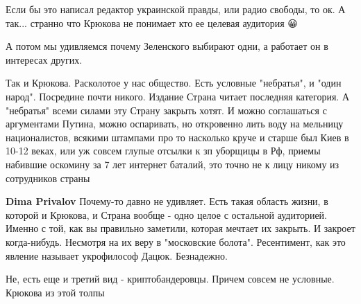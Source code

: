 \begin{itemize}
 
Если бы это написал редактор украинской правды, или радио свободы, то ок. А
так... странно что Крюкова не понимает кто ее целевая аудитория 😀

А потом мы удивляемся почему Зеленского выбирают одни, а работает он в
интересах других.

Так и Крюкова. Расколотое у нас общество. Есть условные "небратья", и "один
народ". Посредине почти никого. Издание Страна читает последняя категория. А
"небратья" всеми силами эту Страну закрыть хотят. И можно соглашаться с
аргументами Путина, можно оспаривать, но откровенно лить воду на мельницу
националистов, всякими штампами про то насколько круче и старше был Киев в
10-12 веках, или уж совсем глупые отсылки к зп уборщицы в Рф, приемы набившие
оскомину за 7 лет интернет баталий, это точно не к лицу никому из сотрудников
страны

\begin{itemize}
 
\textbf{Dima Privalov} Почему-то давно не удивляет. Есть такая область жизни, в которой и Крюкова, и Страна вообще - одно целое с остальной аудиторией. Именно с той, как вы правильно заметили, которая мечтает их закрыть. И закроет когда-нибудь. Несмотря на их веру в "московские болота". Ресентимент, как это явление называет укрофилософ Дацюк. Безнадежно.

 
Не, есть еще и третий вид - криптобандеровцы. Причем совсем не условные. Крюкова из этой толпы \Laughey[1.0][white]


 

\end{itemize}
\end{itemize}
